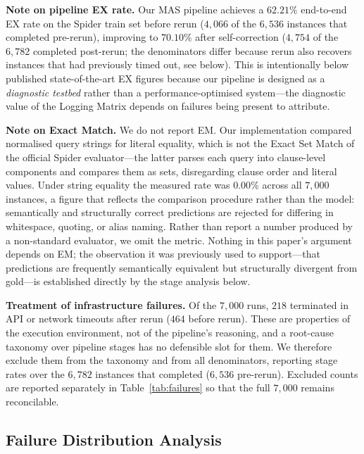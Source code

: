 \documentclass[conference]{IEEEtran}
\begin{document}
\noindent\textbf{Note on pipeline EX rate.}
Our MAS pipeline achieves a $62.21\%$ end-to-end EX rate on the Spider train
set before rerun ($4{,}066$ of the $6{,}536$ instances that completed
pre-rerun), improving to $70.10\%$ after self-correction ($4{,}754$ of the
$6{,}782$ completed post-rerun; the denominators differ because rerun also
recovers instances that had previously timed out, see below). This is intentionally below published state-of-the-art EX figures
because our pipeline is designed as a \emph{diagnostic testbed} rather than a
performance-optimised system---the diagnostic value of the Logging Matrix
depends on failures being present to attribute.

\noindent\textbf{Note on Exact Match.}
We do not report EM. Our implementation compared normalised query strings for
literal equality, which is not the Exact Set Match of the official Spider
evaluator---the latter parses each query into clause-level components and
compares them as sets, disregarding clause order and literal values. Under
string equality the measured rate was $0.00\%$ across all $7{,}000$
instances, a figure that reflects the comparison procedure rather than the
model: semantically and structurally correct predictions are rejected for
differing in whitespace, quoting, or alias naming. Rather than report a
number produced by a non-standard evaluator, we omit the metric. Nothing in
this paper's argument depends on EM; the observation it was previously used
to support---that predictions are frequently semantically equivalent but
structurally divergent from gold---is established directly by the stage
analysis below.

\noindent\textbf{Treatment of infrastructure failures.}
Of the $7{,}000$ runs, $218$ terminated in API or network timeouts after
rerun ($464$ before rerun). These are properties of the execution environment,
not of the pipeline's reasoning, and a root-cause taxonomy over pipeline
stages has no defensible slot for them. We therefore exclude them from the
taxonomy and from all denominators, reporting stage rates over the
$6{,}782$ instances that completed ($6{,}536$ pre-rerun). Excluded counts are
reported separately in Table~\ref{tab:failures} so that the full $7{,}000$
remains reconcilable.

\subsection{Failure Distribution Analysis}
\label{sec:failure_dist}
\end{document}
